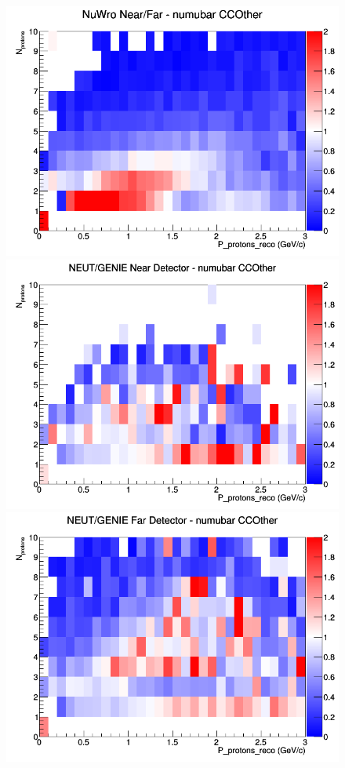 \begin{figure}[h]
\endminipage
{}
\includegraphics[width=\linewidth]{eff_N_P/FGT/protons/ratios/CCOther_NuWro_numubar_NF_N_P.png}
\endminipage
\newline
{}
\includegraphics[width=\linewidth]{eff_N_P/FGT/protons/ratios/CCOther_NEUT_GENIE_numubar_near_N_P.png}
\endminipage
{}
\includegraphics[width=\linewidth]{eff_N_P/FGT/protons/ratios/CCOther_NEUT_GENIE_numubar_far_N_P.png}

\end{figure}
